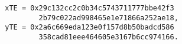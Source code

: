 \begin{verbatim}
        xTE = 0x29c132cc2c0b34c5743711777bbe42f3
                2b79c022ad998465e1e71866a252ae18,
        yTE = 0x2a6c669eda123e0f157d8b50badcd586
                358cad81eee464605e3167b6cc974166.
\end{verbatim}
